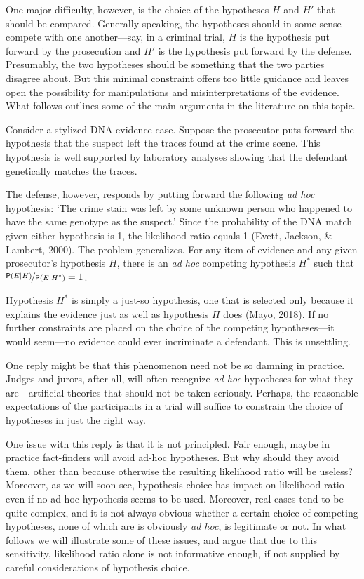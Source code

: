 \documentclass[
  10pt,
  dvipsnames,enabledeprecatedfontcommands]{scrartcl}
\newcommand{\pr}[1]{\mathsf{P}(#1)}
\begin{document}
One major difficulty, however, is the choice of the hypotheses \(H\) and
\(H'\) that should be compared. Generally speaking, the hypotheses
should in some sense compete with one another---say, in a criminal
trial, \(H\) is the hypothesis put forward by the prosecution and \(H'\)
is the hypothesis put forward by the defense. Presumably, the two
hypotheses should be something that the two parties disagree about. But
this minimal constraint offers too little guidance and leaves open the
possibility for manipulations and misinterpretations of the evidence.
What follows outlines some of the main arguments in the literature on
this topic.

Consider a stylized DNA evidence case. Suppose the prosecutor puts
forward the hypothesis that the suspect left the traces found at the
crime scene. This hypothesis is well supported by laboratory analyses
showing that the defendant genetically matches the traces.

The defense, however, responds by putting forward the following
\textit{ad hoc} hypothesis: `The crime stain was left by some unknown
person who happened to have the same genotype as the suspect.' Since the
probability of the DNA match given either hypothesis is 1, the
likelihood ratio equals 1 (Evett, Jackson, \& Lambert, 2000). The
problem generalizes. For any item of evidence and any given prosecutor's
hypothesis \(H\), there is an \textit{ad hoc} competing hypothesis
\(H^*\) such that \(\nicefrac{\pr{E \vert H}}{\pr{E \vert H^*}}=1\).

Hypothesis \(H^*\) is simply a just-so hypothesis, one that is selected
only because it explains the evidence just as well as hypothesis \(H\)
does (Mayo, 2018). If no further constraints are placed on the choice of
the competing hypotheses---it would seem---no evidence could ever
incriminate a defendant. This is unsettling.

One reply might be that this phenomenon need not be so damning in
practice. Judges and jurors, after all, will often recognize
\textit{ad hoc} hypotheses for what they are---artificial theories that
should not be taken seriously. Perhaps, the reasonable expectations of
the participants in a trial will suffice to constrain the choice of
hypotheses in just the right way.

One issue with this reply is that it is not principled. Fair enough,
maybe in practice fact-finders will avoid ad-hoc hypotheses. But why
should they avoid them, other than because otherwise the resulting
likelihood ratio will be useless? Moreover, as we will soon see,
hypothesis choice has impact on likelihood ratio even if no ad hoc
hypothesis seems to be used. Moreover, real cases tend to be quite
complex, and it is not always obvious whether a certain choice of
competing hypotheses, none of which are is obviously \textit{ad hoc}, is
legitimate or not. In what follows we will illustrate some of these
issues, and argue that due to this sensitivity, likelihood ratio alone
is not informative enough, if not supplied by careful considerations of
hypothesis choice.
\end{document}
